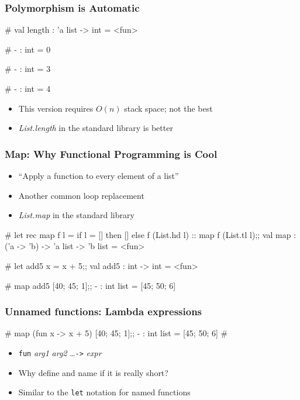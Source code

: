 \documentclass{plt}
\begin{document}
\begin{frame}[fragile]
  \frametitle{Polymorphism is Automatic}
\begin{interactive}
# 
val length : 'a list -> int = <fun>

# 
- : int = 0

# 
- : int = 3

# 
- : int = 4
\end{interactive}

\begin{itemize}
\item This version requires $O(n)$ stack space; not the best
\item \emph{List.length} in the standard library is better
\end{itemize}
\end{frame}

\begin{frame}[fragile]
  \frametitle{Map: Why Functional Programming is Cool}

\begin{itemize}
\item ``Apply a function to every element of a list''
\item Another common loop replacement
\item \emph{List.map} in the standard library
\end{itemize}

\begin{semiverbatim}
# \alert{let rec map f l =}
  \alert{if l = [] then [] else}
  \alert{f (List.hd l) :: map f (List.tl l);;}
    val map : ('a -> 'b) -> 'a list -> 'b list = <fun>

# \alert{let add5 x = x + 5;;}
val add5 : int -> int = <fun>

# \alert{map add5 [40; 45; 1];;}
- : int list = [45; 50; 6]
\end{semiverbatim}
\end{frame}

\begin{frame}[fragile]
  \frametitle{Unnamed functions: Lambda expressions}

\begin{semiverbatim}
# \alert{map (fun x -> x + 5) [40; 45; 1];;}
- : int list = [45; 50; 6]
#
\end{semiverbatim}

\begin{itemize}
\item \verb|fun| \emph{arg1} \emph{arg2} \ldots \verb|->| \emph{expr}
\item Why define and name if it is really short?
\item Similar to the \verb|let| notation for named functions
\end{itemize}
\end{frame}

\fi
\end{document}
